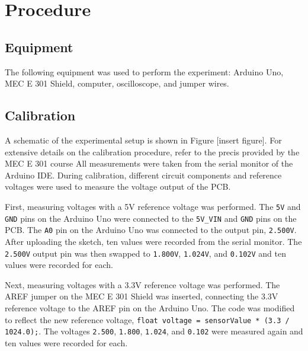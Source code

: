 \section{Procedure}

\subsection{Equipment}
The following equipment was used to perform the experiment: Arduino Uno, MEC E 301 Shield, computer, oscilloscope, and jumper wires.

\subsection{Calibration}
\noindent A schematic of the experimental setup is shown in Figure [insert figure].
For extensive details on the calibration procedure, refer to the precis provided by the MEC E 301 course
All measurements were taken from the serial monitor of the Arduino IDE. During calibration, different circuit components 
and reference voltages were used to measure the voltage output of the PCB.

First, measuring voltages with a 5V reference voltage was performed. The \texttt{5V} and \texttt{GND} pins on the Arduino Uno were
connected to the \texttt{5V\_VIN} and \texttt{GND} pins on the PCB. The \texttt{A0} pin on the Arduino Uno was connected to the output pin,
\texttt{2.500V}. After uploading the sketch, ten values were recorded from the serial monitor. The \texttt{2.500V} output pin was then
swapped to \texttt{1.800V}, \texttt{1.024V}, and \texttt{0.102V} and ten values were recorded for each.

Next, measuring voltages with a 3.3V reference voltage was performed. The AREF jumper on the MEC E 301 Shield was inserted, connecting the
3.3V reference voltage to the AREF pin on the Arduino Uno. The code was modified to reflect the new reference voltage, \texttt{float voltage = sensorValue * (3.3 / 1024.0);}.
The voltages \texttt{2.500}, \texttt{1.800}, \texttt{1.024}, and \texttt{0.102} were measured again and ten values were recorded for each.

